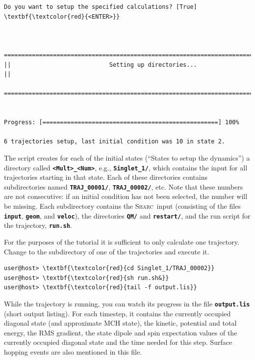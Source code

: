 \documentclass[a4paper,11pt,DIV=15,openany]{scrbook}
\newcommand{\sharc}{\textsc{Sharc}}
\newcommand{\ttt}[1]{\textbf{\texttt{#1}}}
\begin{document}
\begin{oframed}
\begin{Verbatim}[commandchars=\\\{\}]
Do you want to setup the specified calculations? [True] \textbf{\textcolor{red}{<ENTER>}}


  ================================================================================
||                            Setting up directories...                           ||
  ================================================================================


Progress: [==================================================] 100%

6 trajectories setup, last initial condition was 10 in state 2.
\end{Verbatim}
\end{oframed}

\normalsize

The script creates for each of the initial states (``States to setup the dynamics'') a directory called \ttt{<Mult>\_<Num>}, e.g., \ttt{Singlet\_1/}, which contains the input for all trajectories starting in that state. 
Each of these directories contains subdirectories named \ttt{TRAJ\_00001/}, \ttt{TRAJ\_00002/}, etc. 
Note that these numbers are not consecutive: if an initial condition has not been selected, the number will be missing.
Each subdirectory contains the \sharc\ input (consisting of the files \ttt{input}, \ttt{geom}, and \ttt{veloc}), the directories \ttt{QM/} and \ttt{restart/}, and the run script for the trajectory, \ttt{run.sh}.

For the purposes of the tutorial it is sufficient to only calculate one trajectory. Change to the subdirectory of one of the trajectories and execute it.
\begin{Verbatim}[commandchars=\\\{\}]
user@host> \textbf{\textcolor{red}{cd Singlet_1/TRAJ_00002}}
user@host> \textbf{\textcolor{red}{sh run.sh&}}
user@host> \textbf{\textcolor{red}{tail -f output.lis}}
\end{Verbatim}
While the trajectory is running, you can watch its progress in the file \ttt{output.lis} (short output listing). For each timestep, it contains the currently occupied diagonal state (and approximate MCH state), the kinetic, potential and total energy, the RMS gradient, the state dipole and spin expectation values of the currently occupied diagonal state and the time needed for this step. Surface hopping events are also mentioned in this file.
\end{document}
